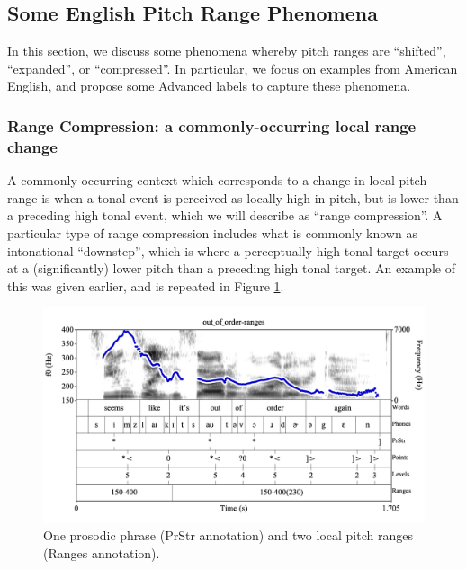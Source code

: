 \documentclass[11pt, twoside]{memoir}
\begin{document}

\subsection{Some English Pitch Range Phenomena}\label{sec:some-english-pitch-range-phenomena}

In this section, we discuss some phenomena whereby pitch ranges are “shifted”, “expanded”, or “compressed”. In particular, we focus on examples from American English, and propose some Advanced labels to capture these phenomena.

\subsubsection{Range Compression: a commonly-occurring local range change}\label{sec:range-compression-a-commonly-occurring-local-range-change}

A commonly occurring context which corresponds to a change in local pitch range is when a tonal event is perceived as locally high in pitch, but is lower than a preceding high tonal event, which we will describe as “range compression”. A particular type of range compression includes what is commonly known as intonational “downstep”, which is where a perceptually high tonal target occurs at a (significantly) lower pitch than a preceding high tonal target. An example of this was given earlier, and is repeated in Figure \ref{fig:out_of_order-ranges Ranges Adv}.

\begin{figure}[H]
\centering
%
\includegraphics[width=.875\linewidth]{Ranges-out_of_order-ranges-2RangeIntervals.png}
%
\caption{One prosodic phrase (PrStr annotation) and two local pitch ranges (Ranges annotation).%
\label{fig:out_of_order-ranges Ranges Adv}%
}
\end{figure}
\end{document}
